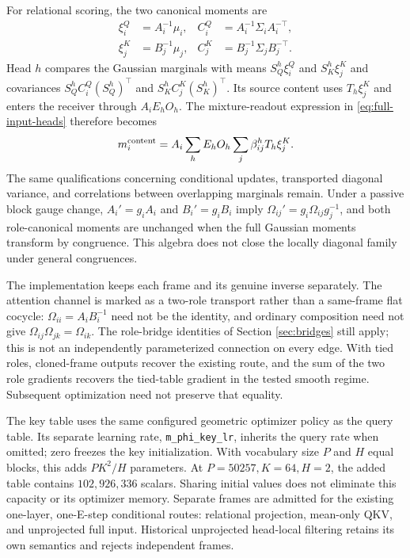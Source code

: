 \documentclass[11pt,letterpaper]{article}
\theoremstyle{remark}
\begin{document}
For relational scoring, the two canonical moments are
\begin{align}
 \xi_i^Q&=A_i^{-1}\mu_i, & C_i^Q&=A_i^{-1}\Sigma_iA_i^{-\top},\\
 \xi_j^K&=B_j^{-1}\mu_j, & C_j^K&=B_j^{-1}\Sigma_jB_j^{-\top}.
\end{align}
Head $h$ compares the Gaussian marginals with means $S_Q^h\xi_i^Q$ and $S_K^h\xi_j^K$ and covariances $S_Q^hC_i^Q(S_Q^h)^\top$ and $S_K^hC_j^K(S_K^h)^\top$. Its source content uses $T_h\xi_j^K$ and enters the receiver through $A_iE_hO_h$. The mixture-readout expression in \eqref{eq:full-input-heads} therefore becomes
\begin{equation}
 m_i^{\rm content}=A_i\sum_h E_hO_h\sum_j\beta_{ij}^hT_h\xi_j^K.
\end{equation}
The same qualifications concerning conditional updates, transported diagonal variance, and correlations between overlapping marginals remain. Under a passive block gauge change, $A_i'=g_iA_i$ and $B_i'=g_iB_i$ imply $\Omega_{ij}'=g_i\Omega_{ij}g_j^{-1}$, and both role-canonical moments are unchanged when the full Gaussian moments transform by congruence. This algebra does not close the locally diagonal family under general congruences.

The implementation keeps each frame and its genuine inverse separately. The attention channel is marked as a two-role transport rather than a same-frame flat cocycle: $\Omega_{ii}=A_iB_i^{-1}$ need not be the identity, and ordinary composition need not give $\Omega_{ij}\Omega_{jk}=\Omega_{ik}$. The role-bridge identities of Section \ref{sec:bridges} still apply; this is not an independently parameterized connection on every edge. With tied roles, cloned-frame outputs recover the existing route, and the sum of the two role gradients recovers the tied-table gradient in the tested smooth regime. Subsequent optimization need not preserve that equality.

The key table uses the same configured geometric optimizer policy as the query table. Its separate learning rate, \texttt{m\_phi\_key\_lr}, inherits the query rate when omitted; zero freezes the key initialization. With vocabulary size $P$ and $H$ equal blocks, this adds $PK^2/H$ parameters. At $P=50257,K=64,H=2$, the added table contains $102{,}926{,}336$ scalars. Sharing initial values does not eliminate this capacity or its optimizer memory. Separate frames are admitted for the existing one-layer, one-E-step conditional routes: relational projection, mean-only QKV, and unprojected full input. Historical unprojected head-local filtering retains its own semantics and rejects independent frames.
\end{document}
